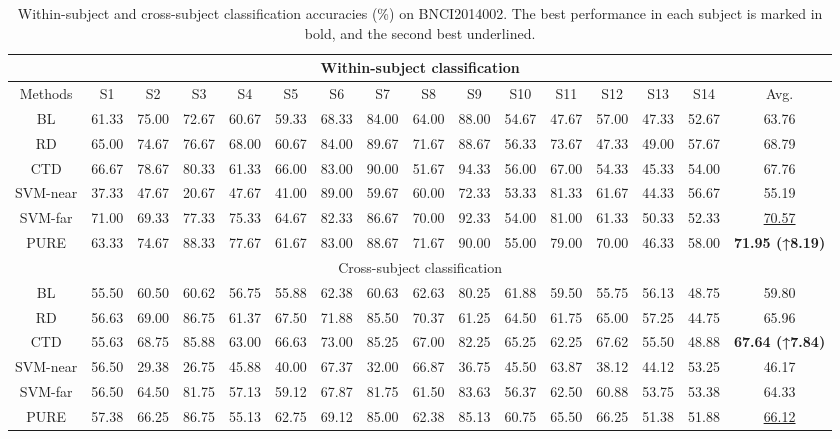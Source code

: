 \documentclass[journal,twocolumn]{IEEEtran}
\begin{document}
\begin{table}[htpb] \centering
  \caption{Within-subject and cross-subject classification accuracies (\%) on BNCI2014002. The best performance in each subject is marked in bold, and the second best underlined.}
  \label{tab:2014002-result}
  \begin{tabular}{c|c|c|c|c|c|c|c|c|c|c|c|c|c|c|c}
  \toprule
  \multicolumn{16}{c}{Within-subject classification} \\
  \midrule
  Methods & S1 & S2 & S3 & S4 & S5 & S6 & S7 & S8 & S9 & S10 & S11 & S12 & S13 & S14 & Avg. \\
  \midrule
  BL & 61.33 & 75.00 & 72.67 & 60.67 & 59.33 & 68.33 & 84.00 & 64.00 & 88.00 & 54.67 & 47.67 & 57.00 & 47.33 & 52.67 & 63.76 \\
  RD & 65.00 & 74.67 & 76.67 & 68.00 & 60.67 & 84.00 & 89.67 & 71.67 & 88.67 & 56.33 & 73.67 & 47.33 & 49.00 & 57.67 & 68.79 \\
  CTD & 66.67 & 78.67 & 80.33 & 61.33 & 66.00 & 83.00 & 90.00 & 51.67 & 94.33 & 56.00 & 67.00 & 54.33 & 45.33 & 54.00 & 67.76 \\
  SVM-near & 37.33 & 47.67 & 20.67 & 47.67 & 41.00 & 89.00 & 59.67 & 60.00 & 72.33 & 53.33 & 81.33 & 61.67 & 44.33 & 56.67 & 55.19 \\
  SVM-far & 71.00 & 69.33 & 77.33 & 75.33 & 64.67 & 82.33 & 86.67 & 70.00 & 92.33 & 54.00 & 81.00 & 61.33 & 50.33 & 52.33 & \underline{70.57} \\
  PURE & 63.33 & 74.67 & 88.33 & 77.67 & 61.67 & 83.00 & 88.67 & 71.67 & 90.00 & 55.00 & 79.00 & 70.00 & 46.33 & 58.00 & \textbf{71.95 (↑8.19)} \\
  \midrule
  \multicolumn{16}{c}{Cross-subject classification} \\
  \midrule
  BL & 55.50 & 60.50 & 60.62 & 56.75 & 55.88 & 62.38 & 60.63 & 62.63 & 80.25 & 61.88 & 59.50 & 55.75 & 56.13 & 48.75 & 59.80 \\
  RD & 56.63 & 69.00 & 86.75 & 61.37 & 67.50 & 71.88 & 85.50 & 70.37 & 61.25 & 64.50 & 61.75 & 65.00 & 57.25 & 44.75 & 65.96 \\
  CTD & 55.63 & 68.75 & 85.88 & 63.00 & 66.63 & 73.00 & 85.25 & 67.00 & 82.25 & 65.25 & 62.25 & 67.62 & 55.50 & 48.88 & \textbf{67.64 (↑7.84)} \\
  SVM-near & 56.50 & 29.38 & 26.75 & 45.88 & 40.00 & 67.37 & 32.00 & 66.87 & 36.75 & 45.50 & 63.87 & 38.12 & 44.12 & 53.25 & 46.17 \\
  SVM-far & 56.50 & 64.50 & 81.75 & 57.13 & 59.12 & 67.87 & 81.75 & 61.50 & 83.63 & 56.37 & 62.50 & 60.88 & 53.75 & 53.38 & 64.33 \\
  PURE & 57.38 & 66.25 & 86.75 & 55.13 & 62.75 & 69.12 & 85.00 & 62.38 & 85.13 & 60.75 & 65.50 & 66.25 & 51.38 & 51.88 & \underline{66.12} \\
  \bottomrule
  \end{tabular}
\end{table}
\end{document}
